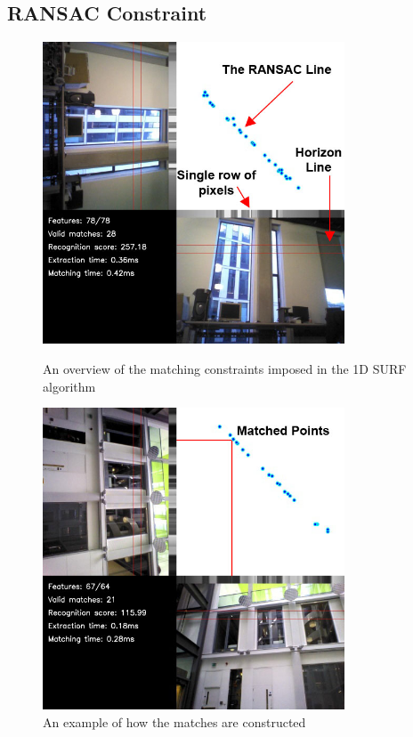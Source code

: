 \documentclass[11pt]{report}
\begin{document}
\subsection{RANSAC Constraint}
\label{sec:ransacConstraint}


\begin{figure}[ht!]
\begin{minipage}[b]{0.5\linewidth}
  \centering
    \includegraphics[width=0.8\textwidth]{../Drawings/constraints/matchingLabelled.jpg}
    \caption{An overview of the matching constraints imposed in the 1D SURF algorithm} 
    \label{fig:ransacOverview}
\end{minipage}
\begin{minipage}[b]{0.5\linewidth}
  \centering
    \includegraphics[width=0.8\textwidth]{../Drawings/constraints/matchedPoints.jpg}
    \caption{An example of how the matches are constructed} 
    \label{fig:ransacExample}
\end{minipage}
\end{figure}
\end{document}
